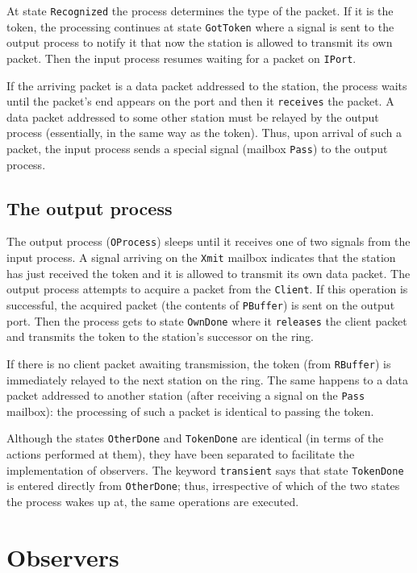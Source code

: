 At state {\tt Recognized} the process determines the type of the
packet.
If it is the token, the processing continues at state {\tt GotToken} where
a signal is sent to the output process to notify it that now the station
is allowed to transmit its own packet.
Then the input process resumes waiting for a packet on {\tt IPort}.

If the arriving packet is a data packet addressed to the
station, the process waits until the packet's end appears on the port and then
it {\tt receives} the packet.
A data packet addressed to some other station must be relayed by the
output process (essentially, in the same way as the token).
Thus, upon arrival of such a packet, the input process sends a special
signal (mailbox {\tt Pass}) to the output process.

\subsection{The output process}

The output process ({\tt OProcess}) sleeps until it receives
one of two signals from the input process.
A signal arriving on the {\tt Xmit} mailbox
indicates that the station has just
received the token and it is allowed to transmit its own data packet.
The output process attempts to acquire a packet from the {\tt Client}.
If this operation is successful,
the acquired packet (the contents of {\tt PBuffer}) is sent on the output port.
Then the process gets to state {\tt OwnDone} where it
{\tt releases} the client packet and
transmits the token to the station's successor on the ring.

If there is no client packet awaiting transmission, the token (from
{\tt RBuffer}) is immediately relayed to the next station on the ring.
The same happens to a data packet addressed to another station (after
receiving a signal on the {\tt Pass} mailbox): the processing of such a packet
is identical to passing the token.

Although the states {\tt OtherDone} and {\tt TokenDone} are identical (in
terms of the actions performed at them), they have been separated to facilitate
the implementation of observers.
The keyword {\tt transient} says that state {\tt TokenDone} is entered
directly from {\tt OtherDone}; thus, irrespective of which of the two states
the process wakes up at, the same operations are executed.

\section{Observers}

